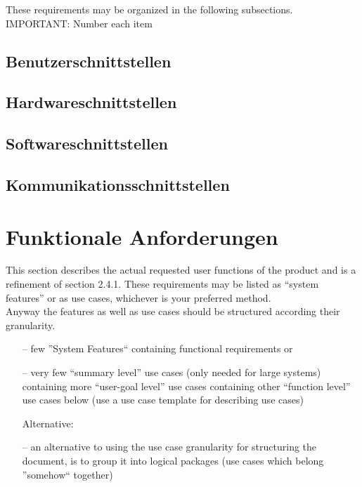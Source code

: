 \noindent These requirements may be organized in the following subsections. \\[0.1cm]
IMPORTANT: Number each item

\subsection{Benutzerschnittstellen}

\subsection{Hardwareschnittstellen}

\subsection{Softwareschnittstellen}

\subsection{Kommunikationsschnittstellen}

\newpage

\section{Funktionale Anforderungen}
This section describes the actual requested user functions of the product and is a refinement of section 2.4.1. These requirements may be listed as “system features” or as use cases, whichever is your preferred method. \\[-0.3cm]

\noindent Anyway the features as well as use cases should be structured according their granularity.
\begin{itemize}
	\item[--] few ''System Features`` containing functional requirements or
	\item[--] very few “summary level” use cases (only needed for large systems) containing more “user-goal level” use cases containing other “function level” use cases below (use a use case template for describing use cases)
	\item[] Alternative:
	\item[--] an alternative to using the use case granularity for structuring the document, is to group it into logical packages (use cases which belong ''somehow`` together)
\end{itemize}

